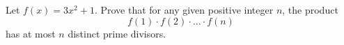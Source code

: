 Let $f(x)=3x^2+1$. Prove that for any given positive integer $n$, the product
\[
	f(1)\cdot f(2)\cdot\dots\cdot f(n)
\]
has at most $n$ distinct prime divisors.
